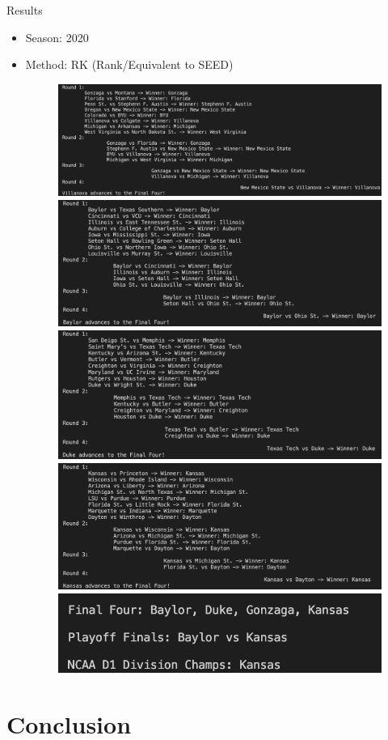 \documentclass{beamer}
\begin{document}
\begin{frame}{Results}
\begin{itemize}
  \item Season: 2020 
  \item Method: RK (Rank/Equivalent to SEED)
  
      \begin{figure}
      \includegraphics[width=0.4\linewidth]{CBB2020_rank_west16.png}
      \includegraphics[width=0.4\linewidth]{CBB2020_rank_south16.png}
      \includegraphics[width=0.4\linewidth]{CBB2020_rank_east16.png}
      \includegraphics[width=0.4\linewidth]{CBB2020_rank_midwest16.png}
      \includegraphics[width=0.6\linewidth]{CBB2020_rank_final.png}    
      \end{figure}
    
\end{itemize}
\end{frame}

\section{Conclusion}
\end{document}
